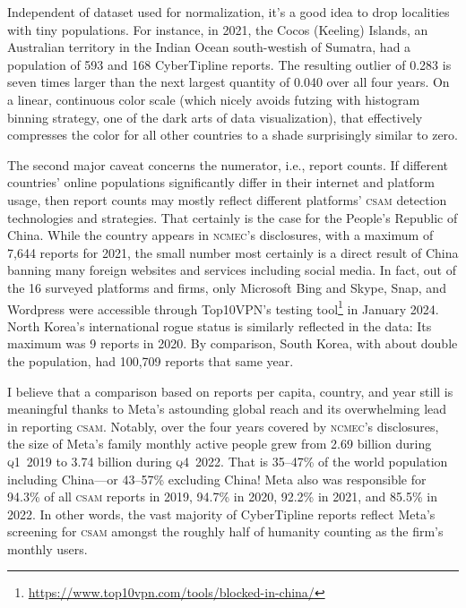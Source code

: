 \documentclass[nonacm,screen]{acmart}
\newcommand\V[1]{\textsc{\MakeLowercase{#1}}}
\begin{document}
Independent of dataset used for normalization, it's a good idea to drop
localities with tiny populations. For instance, in 2021, the Cocos (Keeling)
Islands, an Australian territory in the Indian Ocean south-westish of Sumatra,
had a population of 593 and 168 CyberTipline reports. The resulting outlier of
0.283 is seven times larger than the next largest quantity of 0.040 over all
four years. On a linear, continuous color scale (which nicely avoids futzing
with histogram binning strategy, one of the dark arts of data visualization),
that effectively compresses the color for all other countries to a shade
surprisingly similar to zero.

The second major caveat concerns the numerator, i.e., report counts. If
different countries' online populations significantly differ in their internet
and platform usage, then report counts may mostly reflect different platforms'
\V{CSAM} detection technologies and strategies. That certainly is the case for
the People's Republic of China. While the country appears in \V{NCMEC}'s
disclosures, with a maximum of 7,644 reports for 2021, the small number most
certainly is a direct result of China banning many foreign websites and services
including social media. In fact, out of the 16 surveyed platforms and firms,
only Microsoft Bing and Skype, Snap, and Wordpress were accessible through
Top10VPN's testing
tool\footnote{\url{https://www.top10vpn.com/tools/blocked-in-china/}} in January
2024. North Korea's international rogue status is similarly reflected in the
data: Its maximum was 9 reports in 2020. By comparison, South Korea, with about
double the population, had 100,709 reports that same year.

I believe that a comparison based on reports per capita, country, and year still
is meaningful thanks to Meta's astounding global reach and its overwhelming lead
in reporting \V{CSAM}. Notably, over the four years covered by \V{NCMEC}'s
disclosures, the size of Meta's family monthly active people grew from 2.69
billion during \V{Q1}~2019 to 3.74 billion during \V{Q4}~2022. That is 35--47\%
of the world population including China---or 43--57\% excluding China! Meta also
was responsible for 94.3\% of all \V{CSAM} reports in 2019, 94.7\% in 2020,
92.2\% in 2021, and 85.5\% in 2022. In other words, the vast majority of
CyberTipline reports reflect Meta's screening for \V{CSAM} amongst the roughly
half of humanity counting as the firm's monthly users.
\end{document}
